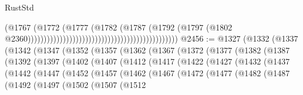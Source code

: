 \begin{lexlean}{RustStd}
\begin{coremodule}
                                                                                  (@1767
                                                                                    (@1772
                                                                                      (@1777
                                                                                        (@1782
                                                                                          (@1787
                                                                                            (@1792
                                                                                              (@1797
                                                                                                (@1802
                                                                                                  @2360)))))))))))))))))))))))))))))))))))))))))))))))
@2456 := @1327
    (@1332
      (@1337
        (@1342
          (@1347
            (@1352
              (@1357
                (@1362
                  (@1367
                    (@1372
                      (@1377
                        (@1382
                          (@1387
                            (@1392
                              (@1397
                                (@1402
                                  (@1407
                                    (@1412
                                      (@1417
                                        (@1422
                                          (@1427
                                            (@1432
                                              (@1437
                                                (@1442
                                                  (@1447
                                                    (@1452
                                                      (@1457
                                                        (@1462
                                                          (@1467
                                                            (@1472
                                                              (@1477
                                                                (@1482
                                                                  (@1487
                                                                    (@1492
                                                                      (@1497
                                                                        (@1502
                                                                          (@1507
                                                                            (@1512

\end{coremodule}
\end{lexlean}
